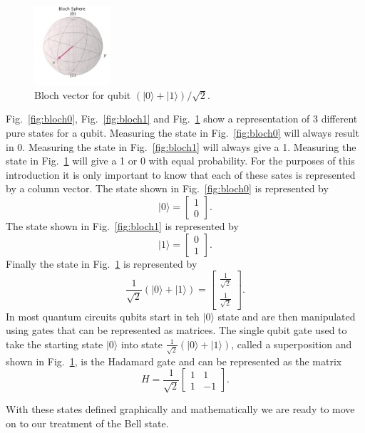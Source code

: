 \documentclass[conference]{IEEEtran}
\newcommand{\ket}[1]{{\lvert #1 \rangle}}
\begin{document}
\begin{figure}[H]
    \centering
    \includegraphics[width=0.25\textwidth]{superpos.png}
    \caption{Bloch vector for qubit $(\ket{0}+\ket{1})/\sqrt{2}$.}
    \label{fig:blochplus}
\end{figure}

Fig.~\ref{fig:bloch0}, Fig.~\ref{fig:bloch1} and Fig.~\ref{fig:blochplus} show a representation of 3 different pure states for a qubit. Measuring the state in Fig.~\ref{fig:bloch0} will always result in 0. Measuring the state in Fig.~\ref{fig:bloch1} will always give a 1. Measuring the state in Fig.~\ref{fig:blochplus} will give a 1 or 0 with equal probability. For the purposes of this introduction it is only important to know that each of these sates is represented by a column vector. The state shown in Fig.~\ref{fig:bloch0} is represented by 
$$
\ket{0} = 
\begin{bmatrix}
1 \\
0
\end{bmatrix}.
$$
The state shown in Fig.~\ref{fig:bloch1} is represented by
$$
\ket{1} =
\begin{bmatrix}
0 \\
1
\end{bmatrix}.
$$
Finally the state in Fig.~\ref{fig:blochplus} is represented by
$$
\frac{1}{\sqrt{2}}(\ket{0}+\ket{1}) = 
\begin{bmatrix}
    \frac{1}{\sqrt{2}}\\
    \frac{1}{\sqrt{2}}
\end{bmatrix}.
$$
In most quantum circuits qubits start in teh $\ket{0}$ state and are then manipulated using gates that can be represented as matrices. The single qubit gate used to take the starting state $\ket{0}$ into state $\frac{1}{\sqrt{2}}(\ket{0}+\ket{1})$, called a superposition and shown in Fig.~\ref{fig:blochplus}, is the Hadamard gate and can be represented as the matrix
$$
H = \frac{1}{\sqrt{2}}
\begin{bmatrix}
    1 & 1 \\
    1 & -1
\end{bmatrix}.
$$

With these states defined graphically and mathematically we are ready to move on to our treatment of the Bell state. 
\end{document}
